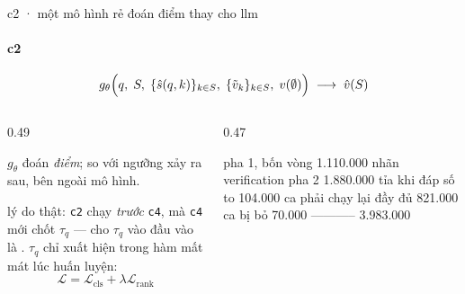 \begin{frame}[fragile]{c2 · một mô hình rẻ đoán điểm thay cho llm}
  \framesubtitle{c2}

  \[
    g_\theta\Bigl(q,\; S,\; \{\hat s(q,k)\}_{k \in S},\;
                  \{\tilde v_k\}_{k \in S},\; v(\emptyset)\Bigr)
    \;\longrightarrow\; \hat v(S)
  \]

  \vspace{-0.1em}
  \begin{columns}[t]
  \begin{column}{0.49\textwidth}
    \begin{badb}[title={$\tau_q$ KHÔNG được làm đầu vào}]
      $g_\theta$ đoán \emph{điểm}; so với ngưỡng xảy ra sau, bên ngoài mô hình.
      \vspace{0.3em}

      lý do thật: \texttt{c2} chạy \emph{trước} \texttt{c4}, mà \texttt{c4} mới
      chốt $\tau_q$ — cho $\tau_q$ vào đầu vào là .
      $\tau_q$ chỉ xuất hiện trong hàm mất mát lúc huấn luyện:
      \vspace{-0.2em}
      \[ \mathcal{L} = \mathcal{L}_{\text{cls}} + \lambda \mathcal{L}_{\text{rank}} \]
    \end{badb}
  \end{column}
  \begin{column}{0.47\textwidth}
    \begin{bx}[title={dữ liệu huấn luyện là nhật ký của chính các lượt đã gọi}]
      \begin{dia}
pha 1, bốn vòng           1.110.000 nhãn
verification pha 2        1.880.000
tỉa khi đáp số to           104.000
ca phải chạy lại đầy đủ     821.000
ca bị bỏ                     70.000
                        -----------
                          3.983.000
      \end{dia}
      \vspace{0.25em}
    \end{bx}
  \end{column}
  \end{columns}
\end{frame}

